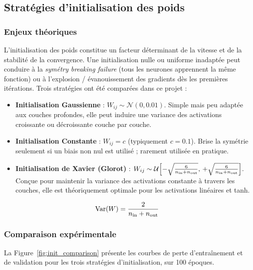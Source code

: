 \documentclass[11pt,a4paper]{article}
\begin{document}
\subsection{Stratégies d'initialisation des poids}

\subsubsection{Enjeux théoriques}

L'initialisation des poids constitue un facteur déterminant de la vitesse et de la
stabilité de la convergence. Une initialisation nulle ou uniforme inadaptée peut
conduire à la \textit{symétry breaking failure} (tous les neurones apprennent la même
fonction) ou à l'explosion / évanouissement des gradients dès les premières itérations.
Trois stratégies ont été comparées dans ce projet :

\begin{itemize}
  \item \textbf{Initialisation Gaussienne} : $W_{ij} \sim \mathcal{N}(0, 0.01)$.
        Simple mais peu adaptée aux couches profondes, elle peut induire une variance
        des activations croissante ou décroissante couche par couche.
  \item \textbf{Initialisation Constante} : $W_{ij} = c$ (typiquement $c = 0.1$).
        Brise la symétrie seulement si un biais non nul est utilisé ; rarement utilisée
        en pratique.
  \item \textbf{Initialisation de Xavier (Glorot)} \cite{glorot2010understanding} :
        $W_{ij} \sim \mathcal{U}\!\left[-\sqrt{\tfrac{6}{n_{\rm in}+n_{\rm out}}},\,
        +\sqrt{\tfrac{6}{n_{\rm in}+n_{\rm out}}}\right]$.
        Conçue pour maintenir la variance des activations constante à travers les couches,
        elle est théoriquement optimale pour les activations linéaires et tanh.
\end{itemize}

\begin{equation}
  \mathrm{Var}(W) = \frac{2}{n_{\rm in} + n_{\rm out}}
  \label{eq:xavier}
\end{equation}

\subsubsection{Comparaison expérimentale}

La Figure~\ref{fig:init_comparison} présente les courbes de perte d'entraînement et
de validation pour les trois stratégies d'initialisation, sur 100 époques.
\end{document}
